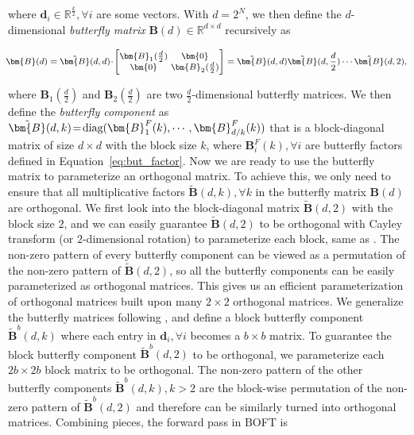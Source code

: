where $\bm{d}_i\in\mathbb{R}^{\frac{k}{2}},\forall i$ are some vectors. With $d=2^N$, we then define the $d$-dimensional \emph{butterfly matrix} $\bm{B}(d)\in\mathbb{R}^{d\times d}$ recursively as

\begin{equation}
\footnotesize
\begin{aligned}
    \!\!\bm{B}(d)=\tilde{\bm{B}}(d,d)\!\cdot\!\begin{bmatrix}
    \bm{B}_1(\frac{d}{2})\!\!\!\!\! & \bm{0} \\
    \bm{0}\!\!\!\!\! &\bm{B}_2(\frac{d}{2})
    \end{bmatrix}= \tilde{\bm{B}}(d,d)\tilde{\bm{B}}(d,\frac{d}{2})\cdots\tilde{\bm{B}}(d,2),
\end{aligned}
\end{equation}

where $\bm{B}_1(\frac{d}{2})$ and $\bm{B}_2(\frac{d}{2})$ are two $\frac{d}{2}$-dimensional butterfly matrices. We then define the \emph{butterfly component} as $\thickmuskip=2mu \medmuskip=2mu \tilde{\bm{B}}(d,k)=\text{diag}(\bm{B}^F_1(k),\cdots,\bm{B}^F_{d/k}(k))$ that is a block-diagonal matrix of size $d\times d$ with the block size $k$, where $\bm{B}^F_i(k),\forall i$ are butterfly factors defined in Equation~\ref{eq:but_factor}. Now we are ready to use the butterfly matrix to parameterize an orthogonal matrix. To achieve this, we only need to ensure that all multiplicative factors $\tilde{\bm{B}}(d,k),\forall k$ in the butterfly matrix $\bm{B}(d)$ are orthogonal. We first look into the block-diagonal matrix $\tilde{\bm{B}}(d,2)$ with the block size $2$, and we can easily guarantee $\tilde{\bm{B}}(d,2)$ to be orthogonal with Cayley transform (or $2$-dimensional rotation) to parameterize each block, same as \cite{liu2021orthogonal,qiu2023controlling}. The non-zero pattern of every butterfly component can be viewed as a permutation of the non-zero pattern of $\tilde{\bm{B}}(d,2)$, so all the butterfly components can be easily parameterized as orthogonal matrices. This gives us an efficient parameterization of orthogonal matrices built upon many $2\times 2$ orthogonal matrices. We generalize the butterfly matrices following \cite{chen2022pixelated}, and define a block butterfly component $\tilde{\bm{B}}^b(d,k)$ where each entry in $\bm{d}_i,\forall i$ becomes a $b\times b$ matrix. To guarantee the block butterfly component $\tilde{\bm{B}}^b(d,2)$ to be orthogonal, we parameterize each $2b\times 2b$ block matrix to be orthogonal. The non-zero pattern of the other butterfly components $\tilde{\bm{B}}^b(d,k),k>2$ are the block-wise permutation of the non-zero pattern of $\tilde{\bm{B}}^b(d,2)$ and therefore can be similarly turned into orthogonal matrices. Combining pieces, the forward pass in BOFT is

